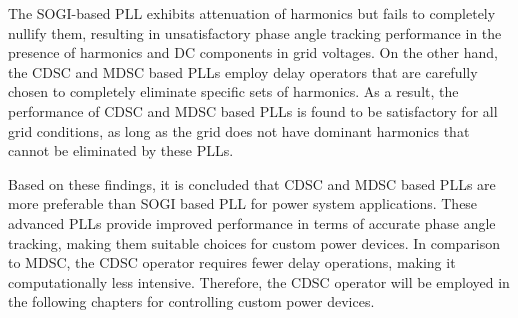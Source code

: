 The SOGI-based PLL exhibits attenuation of harmonics but fails to completely nullify them, resulting in unsatisfactory phase angle tracking performance in the presence of harmonics and DC components in grid voltages. On the other hand, the CDSC and MDSC based PLLs employ delay operators that are carefully chosen to completely eliminate specific sets of harmonics. As a result, the performance of CDSC and MDSC based PLLs is found to be satisfactory for all grid conditions, as long as the grid does not have dominant harmonics that cannot be eliminated by these PLLs.

Based on these findings, it is concluded that CDSC and MDSC based PLLs are more preferable than SOGI based PLL for power system applications. These advanced PLLs provide improved performance in terms of accurate phase angle tracking, making them suitable choices for custom power devices. In comparison to MDSC, the CDSC operator requires fewer delay operations, making it computationally less intensive. Therefore, the CDSC operator will be employed in the following chapters for controlling custom power devices. 